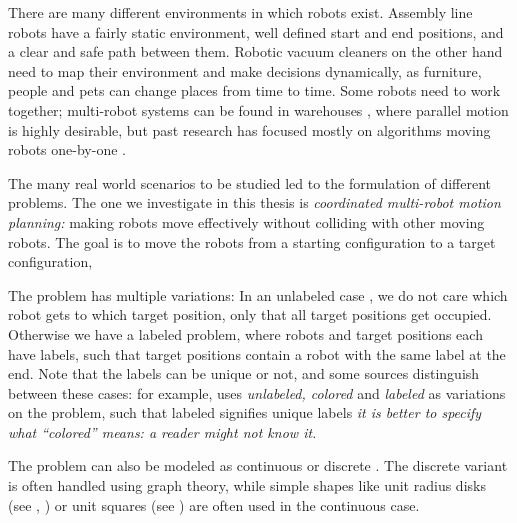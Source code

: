 There are many different environments in which robots exist. 
Assembly line robots have a fairly static environment, well defined start and end positions, and a clear and safe path between them.
Robotic vacuum cleaners on the other hand need to map their environment and make decisions dynamically, as furniture, people and pets can change places from time to time. 
Some robots need to work together; multi-robot systems can be found in warehouses \cite{sicilianoSpringerHandbookRobotics2016}, where parallel motion is highly desirable, but past research has focused mostly on algorithms moving robots one-by-one \cite{demaineCoordinatedMotionPlanning2019}.

The many real world scenarios to be studied led to the formulation of different problems.
The one we investigate in this thesis is \emph{coordinated multi-robot motion planning:} making robots move effectively without colliding with other moving robots.
The goal is to move the robots from a starting configuration to a target configuration, 

The problem has multiple variations: 
In an unlabeled case , we do not care which robot gets to which target position, only that all target positions get occupied. 
Otherwise we have a labeled problem, where robots and target positions each have labels, such that target positions contain a robot with the same label at the end. 
Note that the labels can be unique or not, and some sources  distinguish between these cases: for example, \cite{demaineCoordinatedMotionPlanning2019} uses \emph{unlabeled, colored} and \emph{labeled} as variations on the problem, such that labeled signifies unique labels \emph{it is better to specify what ``colored'' means: a reader might not know it.}

The problem can also be modeled as continuous or discrete . The discrete variant is often handled using graph theory, while simple shapes like unit radius disks (see \cite{demaineCoordinatedMotionPlanning2019}, \cite{banyassadyUnlabeledMultiRobotMotion2022}) or unit squares (see \cite{yangCoordinatedPathPlanning2022}) are often used in the continuous case. 

